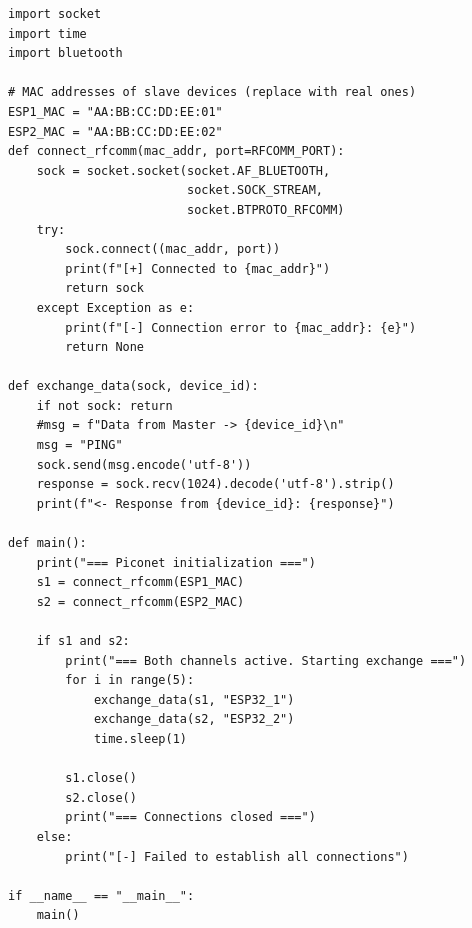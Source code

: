 \begin{lstlisting}[caption={Базовая структура Python-скрипта для управления пикосетью}, label={lst:lab2_1}]
import socket
import time
import bluetooth

# MAC addresses of slave devices (replace with real ones)
ESP1_MAC = "AA:BB:CC:DD:EE:01"
ESP2_MAC = "AA:BB:CC:DD:EE:02"
def connect_rfcomm(mac_addr, port=RFCOMM_PORT):
    sock = socket.socket(socket.AF_BLUETOOTH,
                         socket.SOCK_STREAM,
                         socket.BTPROTO_RFCOMM)
    try:
        sock.connect((mac_addr, port))
        print(f"[+] Connected to {mac_addr}")
        return sock
    except Exception as e:
        print(f"[-] Connection error to {mac_addr}: {e}")
        return None

def exchange_data(sock, device_id):
    if not sock: return
    #msg = f"Data from Master -> {device_id}\n"
    msg = "PING"
    sock.send(msg.encode('utf-8'))
    response = sock.recv(1024).decode('utf-8').strip()
    print(f"<- Response from {device_id}: {response}")

def main():
    print("=== Piconet initialization ===")
    s1 = connect_rfcomm(ESP1_MAC)
    s2 = connect_rfcomm(ESP2_MAC)

    if s1 and s2:
        print("=== Both channels active. Starting exchange ===")
        for i in range(5):
            exchange_data(s1, "ESP32_1")
            exchange_data(s2, "ESP32_2")
            time.sleep(1)

        s1.close()
        s2.close()
        print("=== Connections closed ===")
    else:
        print("[-] Failed to establish all connections")

if __name__ == "__main__":
    main()

\end{lstlisting}

